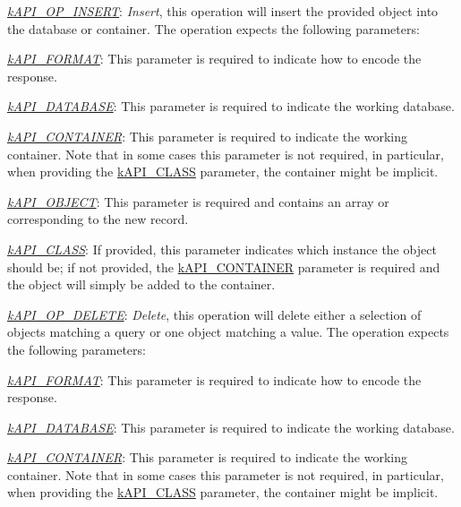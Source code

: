 \begin{DoxyItemize}
\begin{DoxyItemize}
\begin{DoxyItemize}
\end{DoxyItemize}
\item {\itshape \hyperlink{}{k\-A\-P\-I\-\_\-\-O\-P\-\_\-\-I\-N\-S\-E\-R\-T}}\-: {\itshape Insert}, this operation will insert the provided object into the database or container. The operation expects the following parameters\-: 
\begin{DoxyItemize}
\item {\itshape \hyperlink{}{k\-A\-P\-I\-\_\-\-F\-O\-R\-M\-A\-T}}\-: This parameter is required to indicate how to encode the response. 
\item {\itshape \hyperlink{}{k\-A\-P\-I\-\_\-\-D\-A\-T\-A\-B\-A\-S\-E}}\-: This parameter is required to indicate the working database. 
\item {\itshape \hyperlink{}{k\-A\-P\-I\-\_\-\-C\-O\-N\-T\-A\-I\-N\-E\-R}}\-: This parameter is required to indicate the working container. Note that in some cases this parameter is not required, in particular, when providing the \hyperlink{}{k\-A\-P\-I\-\_\-\-C\-L\-A\-S\-S} parameter, the container might be implicit. 
\item {\itshape \hyperlink{}{k\-A\-P\-I\-\_\-\-O\-B\-J\-E\-C\-T}}\-: This parameter is required and contains an array or corresponding to the new record. 
\item {\itshape \hyperlink{}{k\-A\-P\-I\-\_\-\-C\-L\-A\-S\-S}}\-: If provided, this parameter indicates which instance the object should be; if not provided, the \hyperlink{}{k\-A\-P\-I\-\_\-\-C\-O\-N\-T\-A\-I\-N\-E\-R} parameter is required and the object will simply be added to the container. 
\end{DoxyItemize}
\item {\itshape \hyperlink{}{k\-A\-P\-I\-\_\-\-O\-P\-\_\-\-D\-E\-L\-E\-T\-E}}\-: {\itshape Delete}, this operation will delete either a selection of objects matching a query or one object matching a value. The operation expects the following parameters\-: 
\begin{DoxyItemize}
\item {\itshape \hyperlink{}{k\-A\-P\-I\-\_\-\-F\-O\-R\-M\-A\-T}}\-: This parameter is required to indicate how to encode the response. 
\item {\itshape \hyperlink{}{k\-A\-P\-I\-\_\-\-D\-A\-T\-A\-B\-A\-S\-E}}\-: This parameter is required to indicate the working database. 
\item {\itshape \hyperlink{}{k\-A\-P\-I\-\_\-\-C\-O\-N\-T\-A\-I\-N\-E\-R}}\-: This parameter is required to indicate the working container. Note that in some cases this parameter is not required, in particular, when providing the \hyperlink{}{k\-A\-P\-I\-\_\-\-C\-L\-A\-S\-S} parameter, the container might be implicit. 

\end{DoxyItemize}
\end{DoxyItemize}
\end{DoxyItemize}
